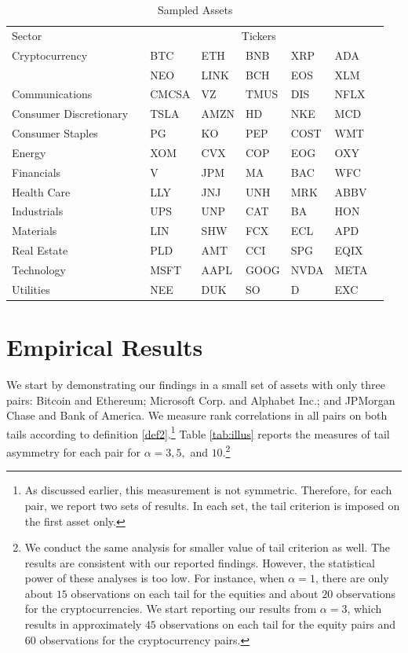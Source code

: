 \documentclass{article}
\begin{document}
\begin{table}[H]\centering
\scriptsize
\caption{Sampled Assets}\label{tab:data}
\begin{tabular}{llllllll}\toprule
Sector & &\multicolumn{5}{c}{Tickers} \\\cmidrule{1-1}\cmidrule{3-7}
Cryptocurrency & &BTC& ETH &BNB &XRP &ADA \\[1.2mm]
 & & NEO & LINK & BCH & EOS & XLM \\[2mm]
Communications & &CMCSA &VZ &TMUS &DIS &NFLX \\[1.2mm]
Consumer Discretionary & &TSLA &AMZN &HD &NKE &MCD  \\[1.2mm]
Consumer Staples & &PG &KO &PEP &COST &WMT  \\[1.2mm]
Energy & &XOM &CVX &COP &EOG &OXY  \\[1.2mm]
Financials & &V &JPM &MA &BAC &WFC  \\[1.2mm]
Health Care & &LLY &JNJ &UNH &MRK &ABBV  \\[1.2mm]
Industrials & &UPS &UNP &CAT &BA &HON  \\[1.2mm]
Materials & &LIN &SHW &FCX &ECL &APD  \\[1.2mm]
Real Estate & &PLD &AMT &CCI &SPG &EQIX  \\[1.2mm]
Technology & &MSFT &AAPL &GOOG &NVDA &META  \\[1.2mm]
Utilities & &NEE &DUK &SO &D &EXC  \\[1.2mm]
\bottomrule
\end{tabular}
\end{table}

\section{Empirical Results}\label{res}
We start by demonstrating our findings in a small set of assets with only three pairs: Bitcoin and Ethereum; Microsoft Corp. and Alphabet Inc.; and JPMorgan Chase and Bank of America. We measure rank correlations in all pairs on both tails according to definition \ref{def2}.\footnote{As discussed earlier, this measurement is not symmetric. Therefore, for each pair, we report two sets of results. In each set, the tail criterion is imposed on the first asset only.} Table \ref{tab:illus} reports the measures of tail asymmetry for each pair for $\alpha = 3, 5,$ and $ 10$.\footnote{We conduct the same analysis for smaller value of tail criterion as well. The results are consistent with our reported findings. However, the statistical power of these analyses is too low. For instance, when $\alpha = 1$, there are only about $15$ observations on each tail for the equities and about $20$ observations for the cryptocurrencies. We start reporting our results from $\alpha = 3$, which results in approximately $45$ observations on each tail for the equity pairs and $60$ observations for the cryptocurrency pairs.}   
\end{document}

